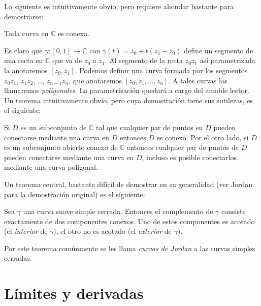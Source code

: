   Lo siguiente es intuitivamente obvio,
  pero requiere ahondar bastante para demostrarse:
  \begin{theorem}
    \label{theo:curve=connected}
    Toda curva en \(\mathbb{C}\) es conexa.
  \end{theorem}
  Es claro que \(\gamma \colon [0, 1] \rightarrow \mathbb{C}\)
  con \(\gamma(t) = z_0 + t (z_1 - z_0)\)
  define un segmento de una recta en \(\mathbb{C}\)
  que va de \(z_0\) a \(z_1\).
  Al segmento de la recta \(z_0 z_1\) así parametrizada
  la anotaremos \([z_0, z_1]\).
  Podemos definir una curva formada
  por los segmentos \(z_0 z_1\),
  \(z_1 z_2\),
  \ldots,
  \(z_{n - 1} z_n\),
  que anotaremos \([z_0, z_1, \dotsc, z_n]\).
  A tales curvas las llamaremos \emph{poligonales}.
  La parametrización quedará a cargo del amable lector.
  Un teorema intuitivamente obvio,
  pero cuya demostración tiene sus sutilezas,
  es el siguiente:
  \begin{theorem}
    \label{theo:connected=curve-inside}
    Si \(D\) es un subconjunto de \(\mathbb{C}\)
    tal que cualquier par de puntos en \(D\)
    pueden conectarse mediante una curva en \(D\)
    entonces \(D\) es conexo.
    Por el otro lado,
    si \(D\) es un subconjunto abierto conexo de \(\mathbb{C}\)
    entonces cualquier par de puntos de \(D\)
    pueden conectarse mediante una curva en \(D\),
    incluso es posible conectarlos mediante una curva poligonal.
  \end{theorem}
  Un teorema central,
  bastante difícil de demostrar en su generalidad
  (ver Jordan~%
    \cite[páginas~587-594]{jordan87:_cours_analyse}
   para la demostración original)
  es el siguiente:
  \begin{theorem}[Jordan]
    \label{theo:Jordan}
    Sea \(\gamma\) una curva suave simple cerrada.
    Entonces el complemento de \(\gamma\)
    consiste exactamente de dos componentes conexos.
    Uno de estos componentes es acotado
    (el \emph{interior} de \(\gamma\)),
    el otro no es acotado
    (el \emph{exterior} de \(\gamma\)).
  \end{theorem}
  Por este teorema comúnmente se les llama \emph{curvas de Jordan}%
  a las curvas simples cerradas.

\section{Límites y derivadas}
\label{sec:limites-derivadas}

